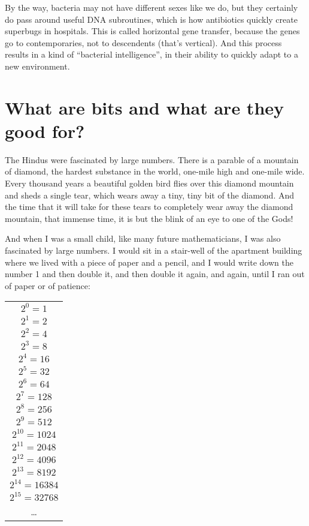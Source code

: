 \documentclass[12pt]{book}
\begin{document}
By the way, bacteria may not have different sexes like we do, but
they certainly do pass around useful DNA subroutines, which is how antibiotics quickly
create superbugs in hospitals.  This is called horizontal gene transfer, because the genes
go to contemporaries, not to descendents (that's vertical). And this process results in a 
kind of ``bacterial intelligence'', in their ability to quickly adapt to a new environment.

\section*{What are bits and what are they good for?}

The Hindus were fascinated by large numbers.  There is a parable of a mountain
of diamond, the hardest substance in the world, one-mile high and one-mile wide.
Every thousand years a beautiful golden bird flies over this diamond mountain and
sheds a single tear, which wears away a tiny, tiny bit of the diamond.  And the
time that it will take for these tears to completely wear away the diamond mountain,
that immense time, it is but the blink of an eye to one of the Gods!
 
And when I was a small child, like many future mathematicians, I was also fascinated
by large numbers. I would sit in a stair-well of the apartment building where we lived
with a piece of paper and a pencil, and I would write down the number 1 and then double it,
and then double it again, and again, until I ran out of paper or of patience:
\begin{center}
\begin{tabular}{c}
$2^0 = 1$ \\
$2^1 = 2$ \\
$2^2 = 4$ \\
$2^3 = 8$ \\
$2^4 = 16$ \\
$2^5 = 32$ \\
$2^6 = 64$ \\
$2^7 = 128$\\
$2^8 = 256$ \\
$2^9 = 512$\\
$2^{10} = 1024$ \\
$2^{11} = 2048$ \\
$2^{12} = 4096$ \\
$2^{13} = 8192$ \\
$2^{14} = 16384$ \\
$2^{15} = 32768$ \\
\ldots
\end{tabular}
\end{center}
 
\end{document}
